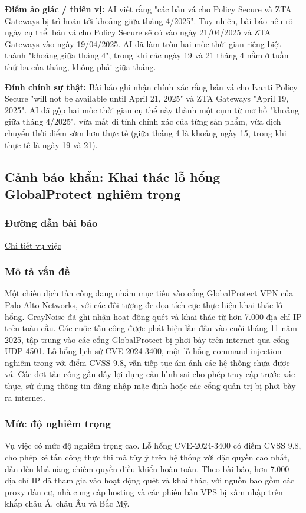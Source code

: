 \textbf{Điểm ảo giác / thiên vị:}
AI viết rằng "các bản vá cho Policy Secure và ZTA Gateways bị trì hoãn tới khoảng giữa tháng 4/2025". Tuy nhiên, bài báo nêu rõ ngày cụ thể: bản vá cho Policy Secure sẽ có vào ngày 21/04/2025 và ZTA Gateways vào ngày 19/04/2025. AI đã làm tròn hai mốc thời gian riêng biệt thành "khoảng giữa tháng 4", trong khi các ngày 19 và 21 tháng 4 nằm ở tuần thứ ba của tháng, không phải giữa tháng.

\textbf{Đính chính sự thật:}
Bài báo ghi nhận chính xác rằng bản vá cho Ivanti Policy Secure "will not be available until April 21, 2025" và ZTA Gateways "April 19, 2025". AI đã gộp hai mốc thời gian cụ thể này thành một cụm từ mơ hồ "khoảng giữa tháng 4/2025", vừa mất đi tính chính xác của từng sản phẩm, vừa dịch chuyển thời điểm sớm hơn thực tế (giữa tháng 4 là khoảng ngày 15, trong khi thực tế là ngày 19 và 21).

\subsection{Cảnh báo khẩn: Khai thác lỗ hổng GlobalProtect nghiêm trọng}

\subsubsection{Đường dẫn bài báo}
\href{https://cybersafe.vnu.edu.vn/news/canh-bao-khan-khai-thac-lo-hong-globalprotect-nghiem-trong-74159}{Chi tiết vụ việc}

\subsubsection{Mô tả vấn đề}
Một chiến dịch tấn công đang nhắm mục tiêu vào cổng GlobalProtect VPN của Palo Alto Networks, với các đối tượng đe dọa tích cực thực hiện khai thác lỗ hổng. GrayNoise đã ghi nhận hoạt động quét và khai thác từ hơn 7.000 địa chỉ IP trên toàn cầu. Các cuộc tấn công được phát hiện lần đầu vào cuối tháng 11 năm 2025, tập trung vào các cổng GlobalProtect bị phơi bày trên internet qua cổng UDP 4501. Lỗ hổng lịch sử CVE-2024-3400, một lỗ hổng command injection nghiêm trọng với điểm CVSS 9.8, vẫn tiếp tục ám ảnh các hệ thống chưa được vá. Các đợt tấn công gần đây lợi dụng cấu hình sai cho phép truy cập trước xác thực, sử dụng thông tin đăng nhập mặc định hoặc các cổng quản trị bị phơi bày ra internet.

\subsubsection{Mức độ nghiêm trọng}
Vụ việc có mức độ nghiêm trọng cao. Lỗ hổng CVE-2024-3400 có điểm CVSS 9.8, cho phép kẻ tấn công thực thi mã tùy ý trên hệ thống với đặc quyền cao nhất, dẫn đến khả năng chiếm quyền điều khiển hoàn toàn. Theo bài báo, hơn 7.000 địa chỉ IP đã tham gia vào hoạt động quét và khai thác, với nguồn bao gồm các proxy dân cư, nhà cung cấp hosting và các phiên bản VPS bị xâm nhập trên khắp châu Á, châu Âu và Bắc Mỹ.

